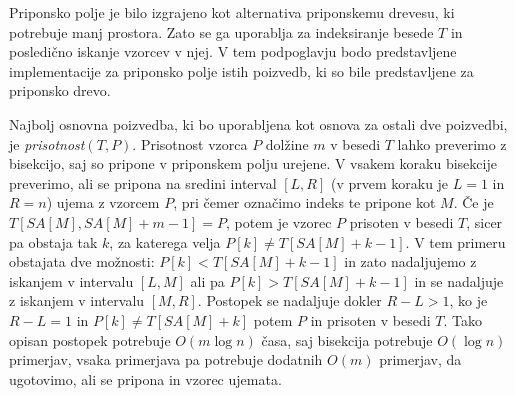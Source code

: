 Priponsko polje je bilo izgrajeno kot alternativa priponskemu drevesu, ki potrebuje manj prostora. Zato se ga uporablja za indeksiranje besede $T$ in posledično iskanje vzorcev v njej. V tem podpoglavju bodo predstavljene implementacije za priponsko polje istih poizvedb, ki so bile predstavljene za priponsko drevo.

Najbolj osnovna poizvedba, ki bo uporabljena kot osnova za ostali dve poizvedbi, je \textit{prisotnost}$(T,P)$. Prisotnost vzorca $P$ dolžine $m$ v besedi $T$ lahko preverimo z bisekcijo, saj so pripone v priponskem polju urejene. V vsakem koraku bisekcije preverimo, ali se pripona na sredini interval $[L,R]$ (v prvem koraku je $L=1$ in $R=n$) ujema z vzorcem $P$, pri čemer označimo indeks te pripone kot $M$. Če je $T[SA[M],SA[M]+m-1]=P$, potem je vzorec $P$ prisoten v besedi $T$, sicer pa obstaja tak $k$, za katerega velja $P[k]\ne T[SA[M]+k-1]$. V tem primeru obstajata dve možnosti: $P[k]<T[SA[M]+k-1]$ in zato nadaljujemo z iskanjem v intervalu $[L,M]$ ali pa $P[k]>T[SA[M]+k-1]$ in se nadaljuje z iskanjem v intervalu $[M,R]$. Postopek se nadaljuje dokler $R-L>1$, ko je $R-L=1$ in $P[k]\ne T[SA[M]+k]$ potem $P$ in prisoten v besedi $T$. Tako opisan postopek potrebuje $O(m\log{n})$ časa, saj bisekcija potrebuje $O(\log{n})$ primerjav, vsaka primerjava pa potrebuje dodatnih $O(m)$ primerjav, da ugotovimo, ali se pripona in vzorec ujemata.

